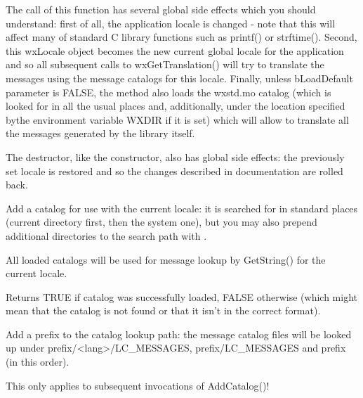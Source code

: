 The call of this function has several global side effects which you should
understand: first of all, the application locale is changed - note that this
will affect many of standard C library functions such as printf() or strftime().
Second, this wxLocale object becomes the new current global locale for the
application and so all subsequent calls to wxGetTranslation() will try to
translate the messages using the message catalogs for this locale. Finally,
unless bLoadDefault parameter is FALSE, the method also loads the wxstd.mo
catalog (which is looked for in all the usual places and, additionally, under
the location specified bythe environment variable WXDIR if it is set) which
will allow to translate all the messages generated by the library itself.

\label{wxlocaledtor}


The destructor, like the constructor, also has global side effects: the previously
set locale is restored and so the changes described in 
 documentation are rolled back.

\label{wxlocaleaddcatalog}


Add a catalog for use with the current locale: it is searched for in standard
places (current directory first, then the system one), but you may also prepend
additional directories to the search path with 
.

All loaded catalogs will be used for message lookup by GetString() for the
current locale.

Returns TRUE if catalog was successfully loaded, FALSE otherwise (which might
mean that the catalog is not found or that it isn't in the correct format).

\label{wxlocaleaddcataloglookuppathprefix}


Add a prefix to the catalog lookup path: the message catalog files will be
looked up under prefix/<lang>/LC\_MESSAGES, prefix/LC\_MESSAGES and prefix
(in this order).

This only applies to subsequent invocations of AddCatalog()!

